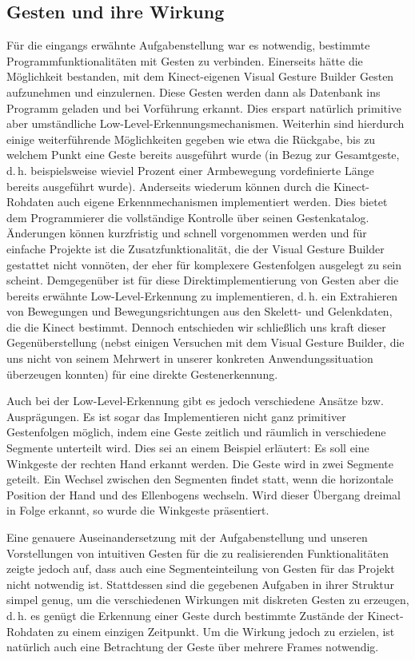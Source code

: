 \subsection{Gesten und ihre Wirkung}
	Für die eingangs erwähnte Aufgabenstellung war es notwendig, bestimmte Programmfunktionalitäten mit Gesten zu verbinden. Einerseits hätte die Möglichkeit bestanden, mit dem Kinect-eigenen Visual Gesture Builder Gesten aufzunehmen und einzulernen. Diese Gesten werden dann als Datenbank ins Programm geladen und bei Vorführung erkannt. Dies erspart natürlich primitive aber umständliche Low-Level-Erkennungsmechanismen. Weiterhin sind hierdurch einige weiterführende Möglichkeiten gegeben wie etwa die Rückgabe, bis zu welchem Punkt eine Geste bereits ausgeführt wurde (in Bezug zur Gesamtgeste, d.\,h. beispielsweise wieviel Prozent einer Armbewegung vordefinierte Länge bereits ausgeführt wurde). Anderseits wiederum können durch die Kinect-Rohdaten auch eigene Erkennmechanismen implementiert werden. Dies bietet dem Programmierer die vollständige Kontrolle über seinen Gestenkatalog. Änderungen können kurzfristig und schnell vorgenommen werden und für einfache Projekte ist die Zusatzfunktionalität, die der Visual Gesture Builder gestattet nicht vonnöten, der eher für komplexere Gestenfolgen ausgelegt zu sein scheint. Demgegenüber ist für diese Direktimplementierung von Gesten aber die bereits erwähnte Low-Level-Erkennung zu implementieren, d.\,h. ein Extrahieren von Bewegungen und Bewegungsrichtungen aus den Skelett- und Gelenkdaten, die die Kinect bestimmt. Dennoch entschieden wir schließlich uns kraft dieser Gegenüberstellung (nebst einigen Versuchen mit dem Visual Gesture Builder, die uns nicht von seinem Mehrwert in unserer konkreten Anwendungssituation überzeugen konnten) für eine direkte Gestenerkennung.\par 
	Auch bei der Low-Level-Erkennung gibt es jedoch verschiedene Ansätze bzw. Ausprägungen. Es ist sogar das Implementieren nicht ganz primitiver Gestenfolgen möglich, indem eine Geste zeitlich und räumlich in verschiedene Segmente unterteilt wird. Dies sei an einem Beispiel erläutert: Es soll eine Winkgeste der rechten Hand erkannt werden. Die Geste wird in zwei Segmente geteilt. Ein Wechsel zwischen den Segmenten findet statt, wenn die horizontale Position der Hand und des Ellenbogens wechseln. Wird dieser Übergang dreimal in Folge erkannt, so wurde die Winkgeste präsentiert.\par
	Eine genauere Auseinandersetzung mit der Aufgabenstellung und unseren Vorstellungen von intuitiven Gesten für die zu realisierenden Funktionalitäten zeigte jedoch auf, dass auch eine Segmenteinteilung von Gesten für das Projekt nicht notwendig ist. Stattdessen sind die gegebenen Aufgaben in ihrer Struktur simpel genug, um die verschiedenen Wirkungen mit diskreten Gesten zu erzeugen, d.\,h. es genügt die Erkennung einer Geste durch bestimmte Zustände der Kinect-Rohdaten zu einem einzigen Zeitpunkt. Um die Wirkung jedoch zu erzielen, ist natürlich auch eine Betrachtung der Geste über mehrere Frames notwendig.\par\medskip
